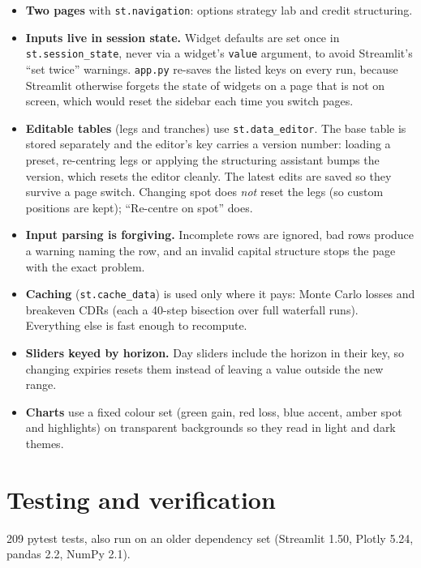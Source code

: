 \documentclass[10pt,a4paper]{article}
\providecommand{\tightlist}{\setlength{\itemsep}{1pt}\setlength{\parskip}{0pt}}
\numberwithin{equation}{section}
\begin{document}
\begin{itemize}
\tightlist
\item
  \textbf{Two pages} with \texttt{st.navigation}: options strategy lab and credit structuring.
\item
  \textbf{Inputs live in session state.} Widget defaults are set once in \texttt{st.session\_state}, never via a widget's \texttt{value} argument, to avoid Streamlit's ``set twice'' warnings. \texttt{app.py} re-saves the listed keys on every run, because Streamlit otherwise forgets the state of widgets on a page that is not on screen, which would reset the sidebar each time you switch pages.
\item
  \textbf{Editable tables} (legs and tranches) use \texttt{st.data\_editor}. The base table is stored separately and the editor's key carries a version number: loading a preset, re-centring legs or applying the structuring assistant bumps the version, which resets the editor cleanly. The latest edits are saved so they survive a page switch. Changing spot does \emph{not} reset the legs (so custom positions are kept); ``Re-centre on spot'' does.
\item
  \textbf{Input parsing is forgiving.} Incomplete rows are ignored, bad rows produce a warning naming the row, and an invalid capital structure stops the page with the exact problem.
\item
  \textbf{Caching} (\texttt{st.cache\_data}) is used only where it pays: Monte Carlo losses and breakeven CDRs (each a 40-step bisection over full waterfall runs). Everything else is fast enough to recompute.
\item
  \textbf{Sliders keyed by horizon.} Day sliders include the horizon in their key, so changing expiries resets them instead of leaving a value outside the new range.
\item
  \textbf{Charts} use a fixed colour set (green gain, red loss, blue accent, amber spot and highlights) on transparent backgrounds so they read in light and dark themes.
\end{itemize}

\section{Testing and verification}\label{testing-and-verification}

209 pytest tests, also run on an older dependency set (Streamlit 1.50, Plotly 5.24, pandas 2.2, NumPy 2.1).
\end{document}
